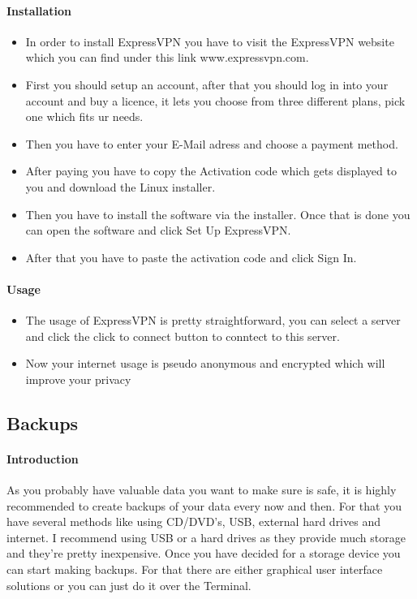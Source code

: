 \documentclass[a4paper,10pt]{article}
\begin{document}
\paragraph{Installation}
\begin{itemize}[leftmargin=*]
\item In order to install ExpressVPN you have to visit the ExpressVPN website which you can find under this link www.expressvpn.com. 
\item First you should setup an account, after that you should log in into your account and buy a licence, it lets you choose from three different plans, pick one which fits ur needs.
\item Then you have to enter your E-Mail adress and choose a payment method.
\item After paying you have to copy the Activation code which gets displayed to you and download the Linux installer.
\item Then you have to install the software via the installer. Once that is done you can open the software and click Set Up ExpressVPN.
\item After that you have to paste the activation code and click Sign In.
\end{itemize}

\paragraph{Usage}
\begin{itemize}[leftmargin=*]
\item The usage of ExpressVPN is pretty straightforward, you can select a server and click the click to connect button to conntect to this server.
\item Now your internet usage is pseudo anonymous and encrypted which will improve your privacy 
\end{itemize}




\subsection{Backups}

\paragraph{Introduction}
As you probably have valuable data you want to make sure is safe, it is highly recommended to create backups of your data every now and then. For that you have several methods like using CD/DVD's, USB, external hard drives and internet. I recommend using USB or a hard drives as they provide much storage and they're pretty inexpensive. Once you have decided for a storage device you can start making backups. For that there are either graphical user interface solutions or you can just do it over the Terminal. 
\end{document}

